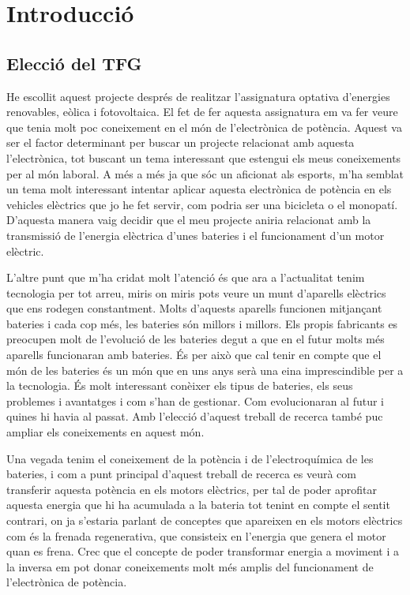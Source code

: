 \chapter{Introducció}
\label{chap:intro}


\section{Elecció del TFG}
He escollit aquest projecte després de realitzar l'assignatura optativa \newline d'energies renovables, eòlica i fotovoltaica. El fet de fer aquesta assignatura em va fer veure que tenia molt poc coneixement en el món de l'electrònica de potència. Aquest va ser el factor determinant per buscar un projecte relacionat amb aquesta l'electrònica, tot buscant un tema interessant que estengui els meus coneixements per al món laboral. A més a més ja que sóc un aficionat als esports, m'ha semblat un tema molt interessant intentar aplicar aquesta electrònica de potència en els vehicles elèctrics que jo he fet servir, com podria ser una bicicleta o el monopatí. D'aquesta manera vaig decidir que el meu projecte aniria relacionat amb la transmissió de l'energia elèctrica d'unes bateries i el funcionament d'un motor elèctric.

L'altre punt que m'ha cridat molt l'atenció és que ara a l'actualitat tenim tecnologia per tot arreu, miris on miris pots veure un munt d'aparells elèctrics que ens rodegen constantment. Molts d'aquests aparells funcionen mitjançant bateries i cada cop més, les bateries són millors i millors. Els propis fabricants es preocupen molt de l'evolució de les bateries degut a que en el futur molts més aparells funcionaran amb bateries. És per això que cal tenir en compte que el món de les bateries és un món que en uns anys serà una eina imprescindible per a la tecnologia. És molt interessant conèixer els tipus de bateries, els seus problemes i avantatges i com s'han de gestionar. Com evolucionaran al futur i quines hi havia al passat. Amb l'elecció d'aquest treball de recerca també puc ampliar els coneixements en aquest món.

Una vegada tenim el coneixement de la potència i de l'electroquímica de les bateries, i com a punt principal d'aquest treball de recerca es veurà com transferir aquesta potència en els motors elèctrics, per tal de poder aprofitar aquesta energia que hi ha acumulada a la bateria tot tenint en compte el sentit contrari, on ja s'estaria parlant de conceptes que apareixen en els motors elèctrics com és la frenada regenerativa, que consisteix en l'energia que genera el motor quan es frena. Crec que el concepte de poder transformar energia a moviment i a la inversa em pot donar coneixements molt més amplis del funcionament de l'electrònica de potència. 

